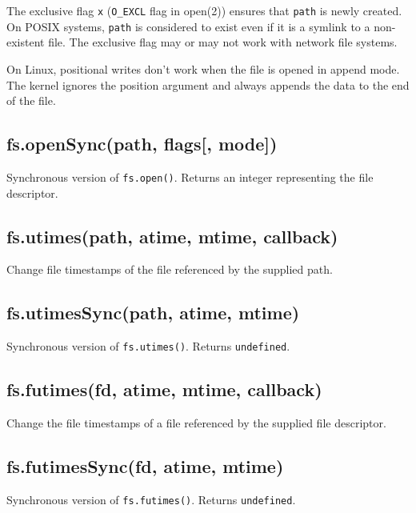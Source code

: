 The exclusive flag \texttt{\textquotesingle{}x\textquotesingle{}}
(\texttt{O\_EXCL} flag in open(2)) ensures that \texttt{path} is newly
created. On POSIX systems, \texttt{path} is considered to exist even if
it is a symlink to a non-existent file. The exclusive flag may or may
not work with network file systems.

On Linux, positional writes don't work when the file is opened in append
mode. The kernel ignores the position argument and always appends the
data to the end of the file.

\subsection{fs.openSync(path, flags{[},
mode{]})}\label{fs.opensyncpath-flags-mode}

Synchronous version of \texttt{fs.open()}. Returns an integer
representing the file descriptor.

\subsection{fs.utimes(path, atime, mtime,
callback)}\label{fs.utimespath-atime-mtime-callback}

Change file timestamps of the file referenced by the supplied path.

\subsection{fs.utimesSync(path, atime,
mtime)}\label{fs.utimessyncpath-atime-mtime}

Synchronous version of \texttt{fs.utimes()}. Returns \texttt{undefined}.

\subsection{fs.futimes(fd, atime, mtime,
callback)}\label{fs.futimesfd-atime-mtime-callback}

Change the file timestamps of a file referenced by the supplied file
descriptor.

\subsection{fs.futimesSync(fd, atime,
mtime)}\label{fs.futimessyncfd-atime-mtime}

Synchronous version of \texttt{fs.futimes()}. Returns
\texttt{undefined}.

